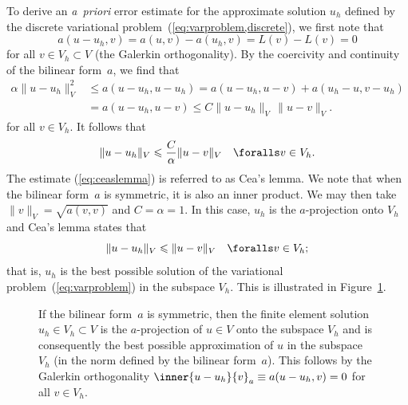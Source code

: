 To derive an \emph{a~priori} error estimate for the approximate
solution $u_h$ defined by the discrete variational
problem~(\ref{eq:varproblem,discrete}), we first note that
\begin{equation}
  a(u - u_h, v) = a(u, v) - a(u_h, v) = L(v) - L(v) = 0
\end{equation}
for all $v \in V_h \subset V$ (the Galerkin orthogonality). By the
coercivity and continuity of the bilinear form~$a$, we find that
\begin{equation}
  \begin{split}
    \alpha \|u - u_h\|_V^2
    &\leqslant a(u - u_h, u - u_h)
    = a(u - u_h, u - v) + a(u_h - u, v - u_h) \\
    &= a(u - u_h, u - v) \leqslant C \|u - u_h\|_V \, \|u - v\|_V.
  \end{split}
\end{equation}
for all $v \in V_h$. It follows that
\begin{equation} \label{eq:ceaslemma}
  \|u - u_h\|_V
  \leqslant \frac{C}{\alpha} \|u - v\|_V \quad \foralls v \in V_h.
\end{equation}
%
The estimate (\ref{eq:ceaslemma}) is referred to as Cea's lemma. We
note that when the bilinear form~$a$ is symmetric, it is also an inner
product. We may then take $\|v\|_V = \sqrt{a(v, v)}$ and $C = \alpha =
1$. In this case, $u_h$ is the $a$-projection onto $V_h$ and Cea's
lemma states that
\begin{equation}
  \|u - u_h\|_V \leqslant \|u - v\|_V \quad \foralls v \in V_h;
\end{equation}
that is, $u_h$ is the best possible solution of the variational
problem~(\ref{eq:varproblem}) in the subspace $V_h$. This is
illustrated in Figure~\ref{fig:ceaslemma}.

\begin{figure}
  \begin{center}
    \caption{If the bilinear form~$a$ is symmetric, then the finite
      element solution~$u_h \in V_h \subset V$ is the $a$-projection
      of $u \in V$ onto the subspace $V_h$ and is consequently the
      best possible approximation of $u$ in the subspace $V_h$ (in the
      norm defined by the bilinear form~$a$). This follows by the Galerkin orthogonality
      $\inner{u - u_h}{v}_a \equiv a(u - u_h, v) = 0$ for all $v \in V_h$.}
    \label{fig:ceaslemma}
  \end{center}
\end{figure}

